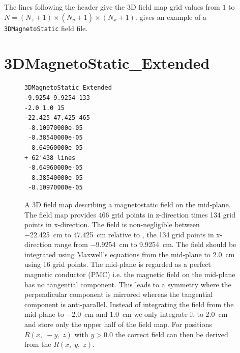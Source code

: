 The lines following the header give the 3D field map grid values from $1$ to $N= (N_{z} + 1) \times (N_{y} + 1) \times (N_{x} + 1)$.
 gives an example of a \texttt{3DMagnetoStatic} field file.

\clearpage
\section{3DMagnetoStatic\_Extended}
\label{sec:3DMagnetoStatic_Extended}
\begin{figure}[h]
  \begin{fmpage}
\begin{verbatim}
3DMagnetoStatic_Extended
-9.9254 9.9254 133
-2.0 1.0 15
-22.425 47.425 465
 -8.10970000e-05
 -8.38540000e-05
 -8.64960000e-05
+ 62'438 lines
 -8.64960000e-05
 -8.38540000e-05
 -8.10970000e-05
\end{verbatim}
  \end{fmpage}
  \caption[Example of a 3DMagnetoStatic\_Extended field map]{A 3D field map describing a magnetostatic field on the mid-plane. The field map provides 466 grid points in z-direction times 134 grid points in x-direction. The field is non-negligible between \SI{-22.425}{\centi\meter} to \SI{47.425}{\centi\meter} relative to , the 134 grid points in x-direction range from \SI{-9.9254}{\centi\meter} to \SI{9.9254}{\centi\meter}. The field should be integrated using Maxwell's equations from the mid-plane to \SI{2.0}{\centi\meter} using 16 grid points. The mid-plane is regarded as a perfect magnetic conductor (PMC) i.e. the magnetic field on the mid-plane has no tangential component. This leads to a symmetry where the perpendicular component is mirrored whereas the tangential component is anti-parallel. Instead of integrating the field from the mid-plane to \SI{-2.0}{\centi\meter} and \SI{1.0}{\centi\meter} we only integrate it to \SI{+2.0}{\centi\meter} and store only the upper half of the field map. For positions $R(x,\;-y,\;z)$ with $y > 0.0$ the correct field can then be derived from the $R(x,\;y,\;z)$.}
  \label{fig:3DMagnetoStatic_Extended}
\end{figure}

